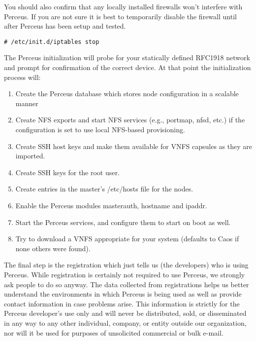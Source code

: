 \documentclass[10pt,letterpaper]{report}
\begin{document}
You should also confirm that any locally installed firewalls won't interfere
with Perceus. If you are not sure it is best to temporarily disable the
firewall until after Perceus has been setup and tested.

\begin{verbatim}
# /etc/init.d/iptables stop
\end{verbatim}

The Perceus initialization will probe for your statically defined RFC1918
network and prompt for confirmation of the correct device. At that point the
initialization process will:

\begin{enumerate}

\item Create the Perceus database which stores node configuration in a
scalable manner

\item Create NFS exports and start NFS services (e.g., portmap, nfsd, etc.) if
the configuration is set to use local NFS-based provisioning.

\item Create SSH host keys and make them available for VNFS capsules as they
are imported.

\item Create SSH keys for the root user.

\item Create entries in the master's /etc/hosts file for the nodes.

\item Enable the Perceus modules masterauth, hostname and ipaddr.

\item Start the Perceus services, and configure them to start on boot as
well.

\item Try to download a VNFS appropriate for your system (defaults to Caos if
none others were found).

\end{enumerate}

The final step is the registration which just tells us (the developers) who is
using Perceus. While registration is certainly not required to use Perceus, we
strongly ask people to do so anyway.  The data collected from registrations
helps us better understand the environments in which Perceus is being used as
well as provide contact information in case problems arise.  This information
is strictly for the Perceus developer's use only and will never be
distributed, sold, or disseminated in any way to any other individual,
company, or entity outside our organization, nor will it be used for purposes
of unsolicited commercial or bulk e-mail.
\end{document}
